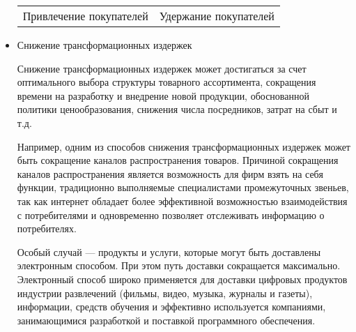 \documentclass[a4paper,english,russian]{G2-105}
\begin{document}
\begin{itemize}
\begin{longtable}{|c|c|}
    Привлечение покупателей & Удержание покупателей \\
\end{longtable}
\item Снижение трансформационных издержек
\par Снижение трансформационных издержек может достигаться за счет оптимального выбора структуры товарного ассортимента, сокращения времени на разработку и внедрение новой продукции, обоснованной политики ценообразования, снижения числа посредников, затрат на сбыт и т.д.
\par Например, одним из способов снижения трансформационных издержек может быть сокращение каналов распространения товаров. Причиной сокращения каналов распространения является возможность для фирм взять на себя функции, традиционно выполняемые специалистами промежуточных звеньев, так как интернет обладает более эффективной возможностью взаимодействия с потребителями и одновременно позволяет отслеживать информацию о потребителях.
\par Особый случай --- продукты и услуги, которые могут быть доставлены электронным способом. При этом путь доставки сокращается максимально. Электронный способ широко применяется для доставки цифровых продуктов индустрии развлечений (фильмы, видео, музыка, журналы и газеты), информации, средств обучения и эффективно используется компаниями, занимающимися разработкой и поставкой программного обеспечения.
\end{itemize}
\end{document}

